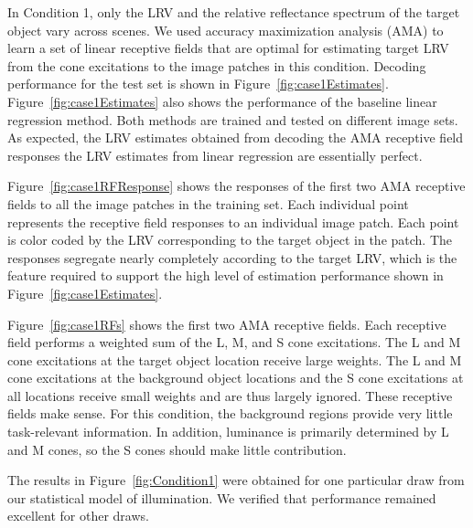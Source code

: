 \documentclass{jov}
\begin{document}
In Condition 1, only the LRV and the relative reflectance spectrum of the target object vary across scenes.
We used accuracy maximization analysis (AMA) to learn a set of linear receptive fields that are optimal for estimating target LRV from the cone excitations to the image patches in this condition. 
Decoding performance for the test set is shown in Figure~\ref{fig:case1Estimates}. 
Figure~\ref{fig:case1Estimates} also shows the performance of the baseline linear regression method. 
Both methods are trained and tested on different image sets.
As expected, the LRV estimates obtained from decoding the AMA receptive field responses the LRV estimates from linear regression are essentially perfect.

Figure~\ref{fig:case1RFResponse} shows the responses of the first two AMA receptive fields to all the image patches in the training set.
Each individual point represents the receptive field responses to an individual image patch.
Each point is color coded by the LRV corresponding to the target object in the patch.
The responses segregate nearly completely according to the target LRV, which is the feature required to support the high level 
of estimation performance shown in Figure~\ref{fig:case1Estimates}.

Figure~\ref{fig:case1RFs} shows the first two AMA receptive fields.
Each receptive field performs a weighted sum of the L, M, and S cone excitations.
The L and M cone excitations at the target object location receive large weights.
The L and M cone excitations at the background object locations and the S cone excitations at all locations receive small weights and are thus largely ignored. 
These receptive fields make sense.
For this condition, the background regions provide very little task-relevant information. 
In addition, luminance is primarily determined by L and M cones, so the S cones should make little
contribution.

The results in Figure~\ref{fig:Condition1} were obtained for one particular draw from our statistical model of illumination.
We verified that performance remained excellent for other draws.
\end{document}
